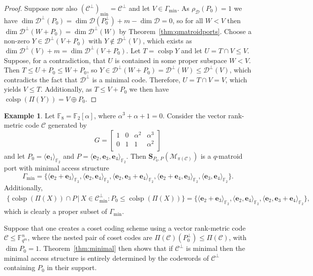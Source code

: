 \documentclass[onecolumn,draftclsnofoot,12pt]{IEEEtran}
\newcommand{\F}{\mathbb{F}}
\newcommand{\C}{\mathcal{C}}
\newcommand{\colsp}{\operatorname{colsp}}
\newcommand{\D}{\mathcal{D}}
\renewcommand{\S}{\mathbf{S}}
\newcommand{\M}{\mathcal{M}}
\theoremstyle{plain} %
\theoremstyle{definition}
\newtheorem{example}[theorem]{Example}
\begin{document}
\begin{proof}
Suppose now also $(\C^\perp)_{\min} = \C^\perp$ and let $V\in \Gamma_{\min}$. As $\rho_\D(P_0)=1$ we have $\dim \D^\perp(P_0) = \dim \D(P_0^\perp) + m - \dim \D = 0$, so for all $W<V$ then $\dim \D^\perp(W+P_0) = \dim \D^\perp(W)$ by Theorem~\ref{thm:qmatroidports}. Choose a non-zero $Y\in \D^\perp(V+P_0)$ with $Y\notin \D^\perp(V)$, which exists as $\dim \D^\perp(V) + m = \dim \D^\perp(V+P_0)$. Let $T=\colsp Y$ and let $U=T\cap V \leq V$. Suppose, for a contradiction, that $U$ is contained in some proper subspace $W<V$. Then $T\leq U+P_0 \leq W+P_0$, so $Y\in \D^\perp(W+P_0) = \D^\perp(W) \leq \D^\perp(V)$, which contradicts the fact that $\D^\perp$ is a minimal code. Therefore, $U=T\cap V = V$, which yields $V\leq T$. Additionally, as $T\leq V+P_0$ we then have $\colsp(\Pi(Y))=V\oplus P_0$.
\end{proof}



\begin{example}
    \label{exmp:minimalcodewords}
    Let $\F_8 = \F_2[\alpha]$, where $\alpha^3+\alpha+1=0$. Consider the vector rank-metric code $\C$ generated by
    \[ G =
    \begin{bmatrix}
        1 & 0 & \alpha^2 & \alpha^3 \\
        0 & 1 & 1 & \alpha^2 \\
    \end{bmatrix}
\]
and let $P_0 = \langle \mathbf{e}_1\rangle_{\F_2}$ and $P = \langle \mathbf{e}_2,\mathbf{e}_3,\mathbf{e}_4\rangle_{\F_2}$. Then $\S_{P_0,P}(\M_{\pi(\C)})$ is a $q$-matroid port with minimal access structure
\[
    \Gamma_{\min} = \{ \langle\mathbf{e}_2+\mathbf{e}_3\rangle_{\F_2}, \langle \mathbf{e}_2,\mathbf{e}_4\rangle_{\F_2},\langle \mathbf{e}_2,\mathbf{e}_3+\mathbf{e}_4\rangle_{\F_2}, \langle \mathbf{e}_2+\mathbf{e}_4,\mathbf{e}_3\rangle_{\F_2}, \langle \mathbf{e}_3,\mathbf{e}_4\rangle_{\F_2}\}.
\]
Additionally, 
\begin{align*}
    \{\colsp(\Pi(X)) \cap P \,|\, X\in \C_{\min}^\perp \colon P_0 \leq \colsp(\Pi(X))\} = \{\langle\mathbf{e}_2+\mathbf{e}_3\rangle_{\F_2},\langle \mathbf{e}_2,\mathbf{e}_4\rangle_{\F_2},\langle \mathbf{e}_2,\mathbf{e}_3+\mathbf{e}_4\rangle_{\F_2} \},
\end{align*}
which is clearly a proper subset of $\Gamma_{\min}$.
\end{example}

Suppose that one creates a coset coding scheme using a vector rank-metric code $\C\leq \F_{q^m}^n$, where the nested pair of coset codes are $\Pi(\C)(P_0^\perp) \leq \Pi(\C)$, with $\dim P_0=1$. Theorem~\ref{thm:minimal} then shows that if $\C^\perp$ is minimal then the minimal access structure is entirely determined by the codewords of $\C^\perp$ containing $P_0$ in their support.
\end{document}
